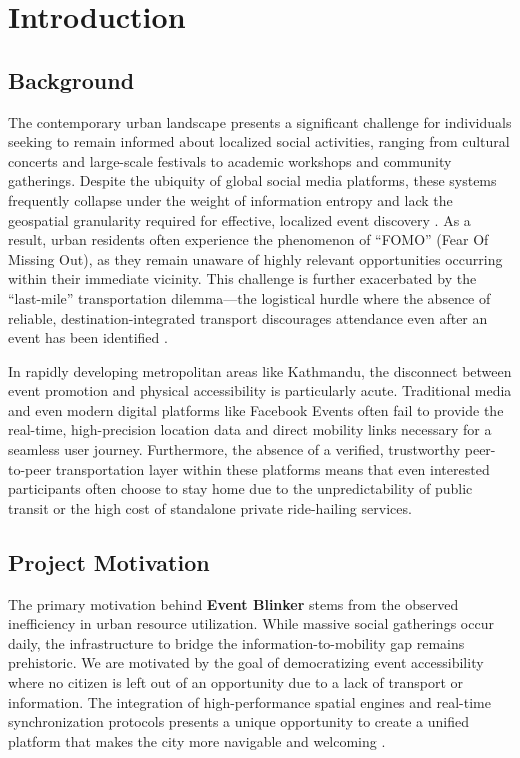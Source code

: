 \chapter{Introduction}
\section{Background}
The contemporary urban landscape presents a significant challenge for individuals seeking to remain informed about localized social activities, ranging from cultural concerts and large-scale festivals to academic workshops and community gatherings. Despite the ubiquity of global social media platforms, these systems frequently collapse under the weight of information entropy and lack the geospatial granularity required for effective, localized event discovery \cite{postgis}. As a result, urban residents often experience the phenomenon of ``FOMO'' (Fear Of Missing Out), as they remain unaware of highly relevant opportunities occurring within their immediate vicinity. This challenge is further exacerbated by the ``last-mile'' transportation dilemma—the logistical hurdle where the absence of reliable, destination-integrated transport discourages attendance even after an event has been identified \cite{reactnative}.

In rapidly developing metropolitan areas like Kathmandu, the disconnect between event promotion and physical accessibility is particularly acute. Traditional media and even modern digital platforms like Facebook Events often fail to provide the real-time, high-precision location data and direct mobility links necessary for a seamless user journey. Furthermore, the absence of a verified, trustworthy peer-to-peer transportation layer within these platforms means that even interested participants often choose to stay home due to the unpredictability of public transit or the high cost of standalone private ride-hailing services.

\section{Project Motivation}
The primary motivation behind \textbf{Event Blinker} stems from the observed inefficiency in urban resource utilization. While massive social gatherings occur daily, the infrastructure to bridge the information-to-mobility gap remains prehistoric. We are motivated by the goal of democratizing event accessibility where no citizen is left out of an opportunity due to a lack of transport or information. The integration of high-performance spatial engines and real-time synchronization protocols presents a unique opportunity to create a unified platform that makes the city more navigable and welcoming \cite{socketio}.


